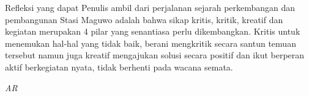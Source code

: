 	Refleksi yang dapat Penulis ambil dari perjalanan sejarah perkembangan dan pembangunan Stasi Maguwo adalah bahwa sikap kritis, kritik, kreatif dan kegiatan merupakan 4 pilar yang senantiasa perlu dikembangkan. Kritis untuk menemukan hal-hal yang tidak baik, berani mengkritik secara santun temuan tersebut namun juga kreatif mengajukan solusi secara positif dan ikut berperan aktif berkegiatan nyata, tidak berhenti pada wacana semata.

\begin{flushright}\textit{AR} \end{flushright}
\normalsize
	